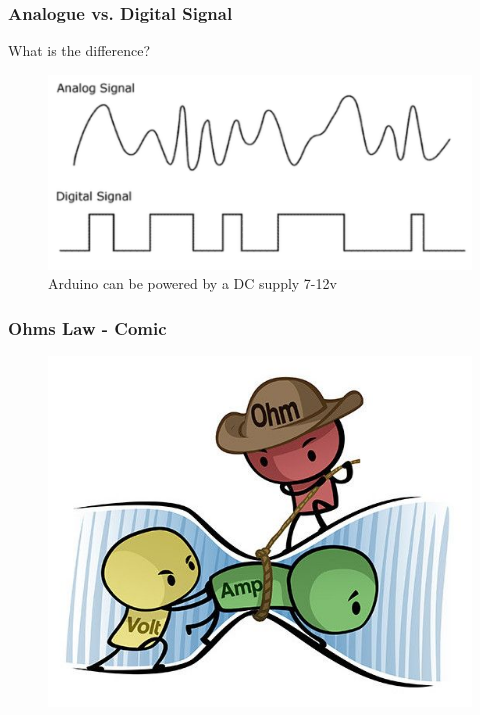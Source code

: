 \begin{frame}
	\frametitle{Analogue vs. Digital Signal}
	What is the difference? 
	
	\pause
	 \begin{figure}
		\includegraphics[scale=.3]{assets/dva} 
		\caption{Arduino can be powered by a DC supply 7-12v}

	\end{figure}
\end{frame}

\begin{frame}
 	\frametitle{Ohms Law - Comic}
   	\begin{figure}
   		\includegraphics[scale=.3]{assets/ohm} 
	\end{figure}
\end{frame}

